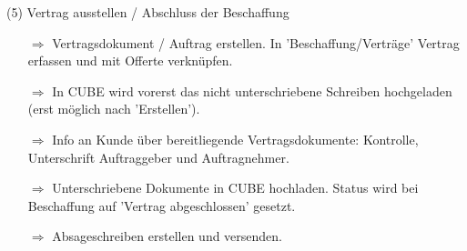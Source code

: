 \documentclass{article}
\begin{document}
\begin{beamerlikethm}{(5) Vertrag ausstellen / Abschluss der Beschaffung}
\begin{itemize}
  \item[$\Longrightarrow$] Vertragsdokument / Auftrag erstellen. In 'Beschaffung/Verträge' Vertrag erfassen und mit Offerte verknüpfen.
	\item[$\Longrightarrow$] In CUBE wird vorerst das nicht unterschriebene Schreiben hochgeladen (erst möglich nach 'Erstellen').
  \item[$\Longrightarrow$] Info an Kunde über bereitliegende Vertragsdokumente: Kontrolle, Unterschrift Auftraggeber und Auftragnehmer.
	\item[$\Longrightarrow$] Unterschriebene Dokumente in CUBE hochladen. Status wird bei Beschaffung auf 'Vertrag abgeschlossen' gesetzt.
	\item[$\Longrightarrow$] Absageschreiben erstellen und versenden.
\end{itemize}
\end{beamerlikethm}

	
	
\end{document}
